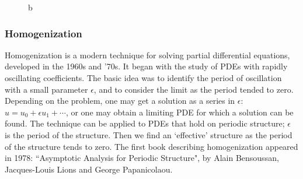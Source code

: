 \documentclass[12pt, a4paper, twoside, openright]{book}
\newcommand{\beff}{\ensuremath{b_{\mathrm{eff}}}}
\begin{document}
\begin{figure}[ht]
\centering
{}
\caption{b}\label{b}
\end{figure}


\subsubsection*{Homogenization}

Homogenization is a modern technique for solving partial differential equations, developed in the 1960s and '70s.  It began with the study of PDEs with rapidly oscillating coefficients.  
The basic idea was to identify the period of oscillation with a small parameter $\epsilon$, and to consider the limit as the period tended to zero.  Depending on the problem, one may get a solution as a series in $\epsilon$: $u = u_0 + \epsilon u_1 + \cdots$, or one may obtain a limiting PDE for which a solution can be found.
The technique can be applied to PDEs that hold on periodic structure; $\epsilon$ is the period of the structure.  Then we find an `effective' structure as the period of the structure tends to zero.  The first book describing homogenization appeared in 1978: ``Asymptotic Analysis for Periodic Structure", by Alain Bensoussan, Jacques-Louis Lions and George Papanicolaou.  
\end{document}
